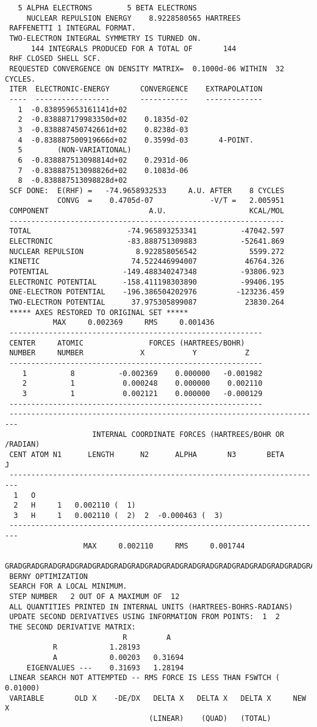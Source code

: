 {\begin{verbatim}
   5 ALPHA ELECTRONS        5 BETA ELECTRONS
     NUCLEAR REPULSION ENERGY    8.9228580565 HARTREES
 RAFFENETTI 1 INTEGRAL FORMAT.
 TWO-ELECTRON INTEGRAL SYMMETRY IS TURNED ON.
      144 INTEGRALS PRODUCED FOR A TOTAL OF       144
 RHF CLOSED SHELL SCF.
 REQUESTED CONVERGENCE ON DENSITY MATRIX=  0.1000d-06 WITHIN  32 CYCLES.
 ITER  ELECTRONIC-ENERGY       CONVERGENCE    EXTRAPOLATION
 ----  -----------------       -----------    -------------
   1  -0.838959653161141d+02
   2  -0.838887179983350d+02    0.1835d-02
   3  -0.838887450742661d+02    0.8238d-03
   4  -0.838887500919666d+02    0.3599d-03       4-POINT.
   5        (NON-VARIATIONAL)
   6  -0.838887513098814d+02    0.2931d-06
   7  -0.838887513098826d+02    0.1083d-06
   8  -0.838887513098828d+02
 SCF DONE:  E(RHF) =   -74.9658932533     A.U. AFTER    8 CYCLES
            CONVG  =    0.4705d-07             -V/T =   2.005951
 COMPONENT                       A.U.                   KCAL/MOL
 ---------------------------------------------------------------
 TOTAL                      -74.965893253341          -47042.597
 ELECTRONIC                 -83.888751309883          -52641.869
 NUCLEAR REPULSION            8.922858056542            5599.272
 KINETIC                     74.522446994007           46764.326
 POTENTIAL                 -149.488340247348          -93806.923
 ELECTRONIC POTENTIAL      -158.411198303890          -99406.195
 ONE-ELECTRON POTENTIAL    -196.386504202976         -123236.459
 TWO-ELECTRON POTENTIAL      37.975305899087           23830.264
 ***** AXES RESTORED TO ORIGINAL SET *****
           MAX     0.002369     RMS     0.001436
 ----------------------------------------------------------
 CENTER     ATOMIC               FORCES (HARTREES/BOHR)
 NUMBER     NUMBER             X           Y           Z
 ----------------------------------------------------------
    1          8          -0.002369    0.000000   -0.001982
    2          1           0.000248    0.000000    0.002110
    3          1           0.002121    0.000000   -0.000129
 ----------------------------------------------------------
 ------------------------------------------------------------------------
                    INTERNAL COORDINATE FORCES (HARTREES/BOHR OR /RADIAN)
 CENT ATOM N1      LENGTH      N2      ALPHA       N3       BETA        J
 ------------------------------------------------------------------------
  1   O 
  2   H     1   0.002110 (  1)
  3   H     1   0.002110 (  2)  2  -0.000463 (  3)
 ------------------------------------------------------------------------
                  MAX     0.002110     RMS     0.001744
 GRADGRADGRADGRADGRADGRADGRADGRADGRADGRADGRADGRADGRADGRADGRADGRADGRADGRAD
 BERNY OPTIMIZATION
 SEARCH FOR A LOCAL MINIMUM.
 STEP NUMBER   2 OUT OF A MAXIMUM OF  12
 ALL QUANTITIES PRINTED IN INTERNAL UNITS (HARTREES-BOHRS-RADIANS)
 UPDATE SECOND DERIVATIVES USING INFORMATION FROM POINTS:  1  2
 THE SECOND DERIVATIVE MATRIX:
                           R         A
           R            1.28193
           A            0.00203   0.31694
     EIGENVALUES ---    0.31693   1.28194
 LINEAR SEARCH NOT ATTEMPTED -- RMS FORCE IS LESS THAN FSWTCH ( 0.01000)
 VARIABLE       OLD X    -DE/DX   DELTA X   DELTA X   DELTA X     NEW X
                                 (LINEAR)    (QUAD)   (TOTAL)


\end{verbatim}}

